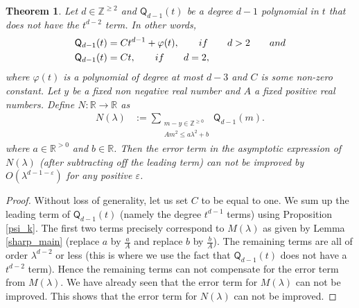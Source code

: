 \documentclass[10pt,a4paper]{amsart}
\newtheorem{thm}{Theorem}
\begin{document}
\begin{thm}
\label{Auxiliary_result_2}
Let $d \in \mathbb{Z}^{\geq 2}$  
and $\mathsf{Q}_{d-1}(t)$ be a degree $d-1$ polynomial in $t$ that does not have the $t^{d-2}$ term. In other words, 
\begin{align}
\mathsf{Q}_{d-1}(t) & = C t^{d-1} + \varphi(t), \qquad \textnormal{if} \qquad d>2 \qquad \textnormal{and} \nonumber \\ 
\mathsf{Q}_{d-1}(t) & = C t, \qquad \textnormal{if} \qquad d=2, \nonumber 
\end{align}
where $\varphi(t)$ is a polynomial of degree at most $d-3$ and 
$C$ is some non-zero constant. 
Let $y$ be a fixed non negative real number and 
$A$ a fixed positive real numbers. 
Define 
$N:\mathbb{R}\longrightarrow \mathbb{R}$ 
as  
\begin{align}
N(\lambda) & := \sum_{\substack{m-y \in \mathbb{Z}^{\geq 0}\\ A m^2 \leq a \lambda^2 + b}}
\mathsf{Q}_{d-1}(m). 
\end{align} 
where $a \in \mathbb{R}^{>0}$ and $b \in \mathbb{R}$. 
Then the error term in the asymptotic expression of $N(\lambda)$ 
(after subtracting off the leading term) can not be improved by $O(\lambda^{d-1-\varepsilon})$ 
for any positive $\varepsilon$. 
\end{thm} 

\begin{proof} Without loss of generality, let us set $C$ to be equal to one.  
We sum up the leading term of $\mathsf{Q}_{d-1}(t)$ 
(namely the degree $t^{d-1}$ terms) using Proposition \ref{psi_k}. 
The first two terms precisely correspond to $M(\lambda)$ as given by 
Lemma \ref{sharp_main} (replace $a$ by $\frac{a}{A}$ and replace $b$ by $\frac{b}{A}$). 
The remaining terms are all of order $\lambda^{d-2}$ or less 
(this is where we use the fact that $\mathsf{Q}_{d-1}(t)$ does not have a $t^{d-2}$ term). 
Hence the remaining terms can not compensate 
for the error term from $M(\lambda)$. We have already seen that the error term for $M(\lambda)$ 
can not be improved. This shows that the error term for $N(\lambda)$ can not be improved.  
\end{proof}
\end{document}

